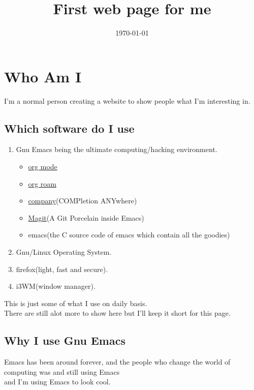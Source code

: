 \documentclass[11pt]{article}
\date{\today}
\title{First web page for me}
\begin{document}
\maketitle
\section{Who Am I}
\label{sec:orgd8ad960}

I'm a normal person creating a website to show people what I'm interesting in.\\

\subsection{Which software do I use}
\label{sec:org82c23f6}

\begin{enumerate}
\item Gnu Emacs being the ultimate computing/hacking environment.\\
\begin{itemize}
\item \href{https://orgmode.org/}{org mode}
\item \href{https://www.orgroam.com/}{org roam}
\item \href{http://company-mode.github.io/}{company}(COMPletion ANYwhere)
\item \href{https://magit.vc/}{Magit}(A Git Porcelain inside Emacs)
\item emacs(the C source code of emacs which contain all the goodies)
\end{itemize}
\item Gnu/Linux Operating System.\\
\item firefox(light, fast and secure).\\
\item i3WM(window manager).\\
\end{enumerate}

This is just some of what I use on daily basis.\\
There are still alot more to show here but I'll keep it short for this page.

\subsection{Why I use Gnu Emacs}
\label{sec:org3b7e249}

Emacs has been around forever, and the people who change the world of computing was and still using Emacs\\
and I'm using Emacs to look cool.
\end{document}

